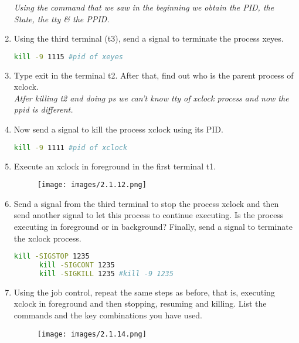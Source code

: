 \documentclass[12pt, titlepage,]{article}
\begin{document}
\begin{enumerate}
    \textit{\color{blue} Using the command that we saw in the beginning we obtain the PID, the State, the tty \& the PPID. }
  
  
  \item Using the third terminal (t3), send a signal to terminate the process xeyes. 
      \begin{lstlisting}[language=Bash]
      kill -9 1115 #pid of xeyes
     \end{lstlisting}

  \item Type exit in the terminal t2. After that, find out who is the parent process of xclock. \\
    \textit{\color{blue} Atfer killing t2 and doing ps we can't know tty of xclock process and now the ppid is different. }
    
  \item Now send a signal to kill the process xclock using its PID. 
    \begin{lstlisting}[language=Bash]
      kill -9 1111 #pid of xclock
    \end{lstlisting}
    
  \item Execute an xclock in foreground in the first terminal t1. 
    \begin{figure}[h] %
    \centering
    {\texttt{[image: images/2.1.12.png]}}
    \end{figure} 
  \item Send a signal from the third terminal to stop the process xclock and then send another signal to let this process to continue executing. Is the process executing in foreground or in background? Finally, send a signal to terminate the xclock process. 
      \begin{lstlisting}[language=Bash]
      kill -SIGSTOP 1235
      kill -SIGCONT 1235
      kill -SIGKILL 1235 #kill -9 1235
    \end{lstlisting}

  \item Using the job control, repeat the same steps as before, that is, executing xclock in foreground and then stopping, resuming and killing. List the commands and the key combinations you have used. 
    \begin{figure}[h] %
    \centering
    {\texttt{[image: images/2.1.14.png]}}
    \end{figure} 
    

\end{enumerate}
\end{document}
